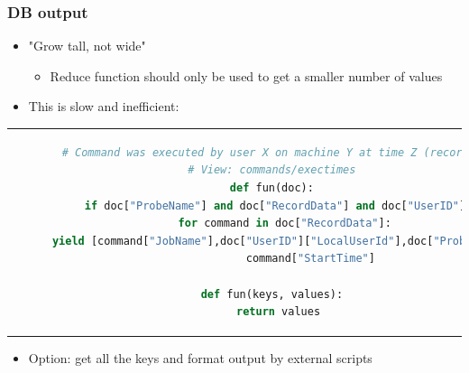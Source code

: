 \documentclass{beamer}
\begin{document}
\begin{frame}[t, fragile]
\frametitle{DB output}
\begin{itemize}
\item "Grow tall, not wide"
\begin{itemize}
	\item Reduce function should only be used to get a smaller number of values
\end{itemize}
\item This is slow and inefficient:
\end{itemize}
{ \tiny
\begin{center}
\begin{tabular}{c}
\begin{lstlisting}[language=Python]
# Command was executed by user X on machine Y at time Z (records)
# View: commands/exectimes
def fun(doc):
  if doc["ProbeName"] and doc["RecordData"] and doc["UserID"]:
    for command in doc["RecordData"]:
      yield [command["JobName"],doc["UserID"]["LocalUserId"],doc["ProbeName"]], 
      		command["StartTime"]
      		
def fun(keys, values):
  return values
\end{lstlisting}
\end{tabular}
\end{center}
}
\begin{itemize}
 \item Option: get all the keys and format output by external scripts
\end{itemize}
\end{frame}
\end{document}
